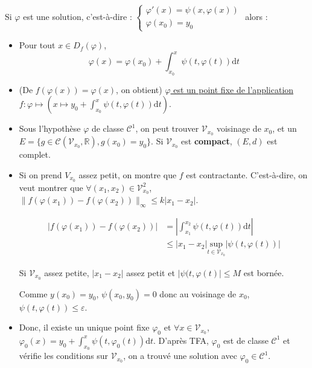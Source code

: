 \begin{myproof}{}{}
Si $\varphi$ est une solution, c'est-à-dire : $\begin{cases}
  \varphi'(x) = \psi(x, \varphi(x)) \\ \varphi(x_0) = y_0
\end{cases}$ alors :

\begin{itemize}

    \item Pour tout $x \in D_f( \varphi)$, 
\[
  \varphi(x) = \varphi(x_0) + \displaystyle\int_{x_0}^{x} \psi(t, \varphi(t)) \mathrm{d}t
\]

\item (De $f(\varphi(x)) = \varphi(x)$, on obtient) \underline{$\varphi$ est un point fixe de l'application} $f : \varphi \mapsto \left(x \mapsto y_0+ \int_{x_0}^{x}\psi(t, \varphi(t) )\mathrm{d}t \right)$.

\item Sous l'hypothèse $\varphi$ de classe $\mathcal{C} ^{1}$, on peut trouver $\mathcal{V}_{x_0}$ voisinage de $x_0$, et un $E = \{g \in \mathcal{C}( \mathcal{V} _{x_0}, \mathbb{R}), g(x_0)=y_0\}$. Si $\mathcal{V}_{x_0}$ est \textbf{compact}, $(E,d)$ est complet.
\item Si on prend $V _{x_0}$ assez petit, on montre que $f$ est contractante. C'est-à-dire, on veut montrer que $\forall (x_1, x_2) \in \mathcal{V} _{x_0} ^{2}$, $\| f(\varphi(x_1)) - f(\varphi(x_2)) \| _{\infty} \le k |x_1 -x_2 |$. 

  \begin{align*}
    |f(\varphi(x_1) ) - f(\varphi(x_2)) | &= | \int _{x_1} ^{x_2} \psi(t, \varphi(t)) \mathrm{d} t | \\ 
                                          &\le |x_1 -x_2 | \underset{t \in \mathcal{V} _{ x_0}}{\mathrm{sup}} |\psi(t, \varphi(t))|
  \end{align*}

  Si $\mathcal{V} _{x_0}$ assez petite, $|x_1 -x_2|$ assez petit et $|\psi(t, \varphi(t)| \le M$ est bornée.

  Comme $y(x_0) = y_0$, $\psi(x_0, y_0) =0$ donc au voisinage de $x_0$, $\psi(t, \varphi(t)) \le \varepsilon$.


\item Donc, il existe un unique point fixe $\varphi_0$ et $\forall x \in \mathcal{V}_{x_0}$, $\varphi_0(x) = y_0 + \int _{x_0} ^{x} \psi (t, \varphi_0(t)) \mathrm{d}t$. D'après TFA, $\varphi_0$ est de classe $\mathcal{C} ^{1}$ et vérifie les conditions sur $\mathcal{V} _{x_0}$, on a trouvé une solution avec $\varphi_0 \in \mathcal{C}^{1}$.
\end{itemize}



\end{myproof}

